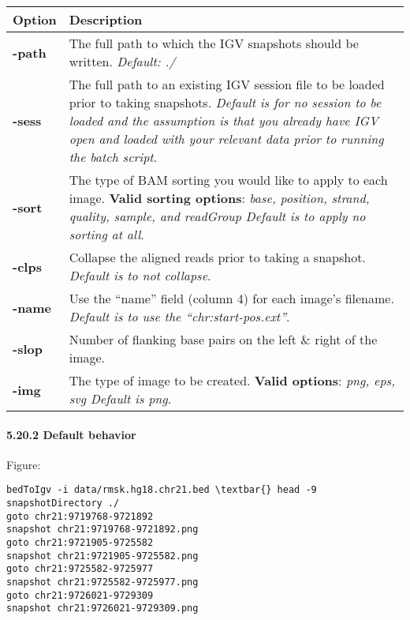\documentclass[letterpaper,10pt,english]{sphinxmanual}
\begin{document}
\begin{tabulary}{\linewidth}{|L|L|}
\hline
\textbf{
Option
} & \textbf{
Description
}\\\hline

\textbf{-path}
 & 
The full path to which the IGV snapshots should be written. \emph{Default: ./}
\\\hline

\textbf{-sess}
 & 
The full path to an existing IGV session file to be loaded prior to taking snapshots. \emph{Default is for no session to be loaded and the assumption is that you already have IGV open and loaded with your relevant data prior to running the batch script}.
\\\hline

\textbf{-sort}
 & 
The type of BAM sorting you would like to apply to each image. \textbf{Valid sorting options}: \emph{base, position, strand, quality, sample, and readGroup Default is to apply no sorting at all}.
\\\hline

\textbf{-clps}
 & 
Collapse the aligned reads prior to taking a snapshot. \emph{Default is to not collapse}.
\\\hline

\textbf{-name}
 & 
Use the ``name'' field (column 4) for each image's filename. \emph{Default is to use the ``chr:start-pos.ext''}.
\\\hline

\textbf{-slop}
 & 
Number of flanking base pairs on the left \& right of the image.
\\\hline

\textbf{-img}
 & 
The type of image to be created. \textbf{Valid options}: \emph{png, eps, svg Default is png}.
\\\hline
\end{tabulary}



\paragraph{5.20.2 Default behavior}
\label{content/bedToIgv:default-behavior}
Figure:

\begin{Verbatim}[commandchars=\\\{\}]
bedToIgv -i data/rmsk.hg18.chr21.bed \textbar{} head -9
snapshotDirectory ./
goto chr21:9719768-9721892
snapshot chr21:9719768-9721892.png
goto chr21:9721905-9725582
snapshot chr21:9721905-9725582.png
goto chr21:9725582-9725977
snapshot chr21:9725582-9725977.png
goto chr21:9726021-9729309
snapshot chr21:9726021-9729309.png
\end{Verbatim}
\end{document}
